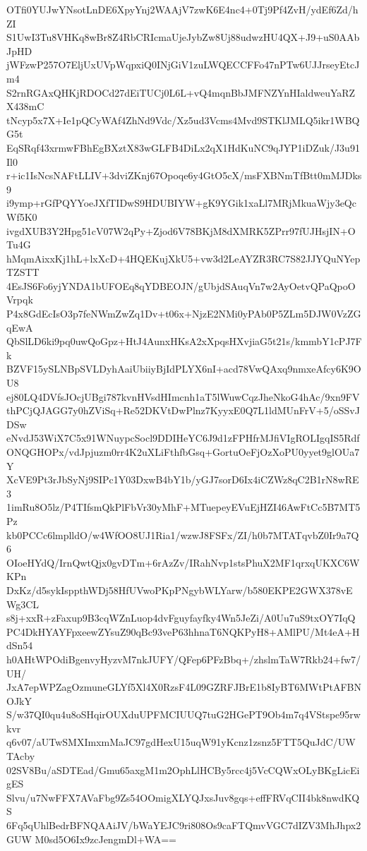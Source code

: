 OTfi0YUJwYNsotLnDE6XpyYnj2WAAjV7zwK6E4nc4+0Tj9Pf4ZvH/ydEf6Zd/hZI
S1UwI3Tu8VHKq8wBr8Z4RbCRIcmaUjeJybZw8Uj88udwzHU4QX+J9+uS0AAbJpHD
jWFzwP257O7EljUxUVpWqpxiQ0INjGiV1zuLWQECCFFo47nPTw6UJJrseyEtcJm4
S2rnRGAxQHKjRDOCd27dEiTUCj0L6L+vQ4mqnBbJMFNZYnHIaldweuYaRZX438mC
tNcyp5x7X+Ie1pQCyWAf4ZhNd9Vdc/Xz5ud3Vcms4Mvd9STKlJMLQ5ikr1WBQG5t
EqSRqf43xrmwFBhEgBXztX83wGLFB4DiLx2qX1HdKuNC9qJYP1iDZuk/J3u91Il0
r+ic1IsNcsNAFtLLIV+3dviZKnj67Opoqe6y4GtO5cX/msFXBNmTfBtt0mMJDks9
i9ymp+rGfPQYYoeJXfTIDwS9HDUBIYW+gK9YGik1xaLl7MRjMkuaWjy3eQcWf5K0
ivgdXUB3Y2Hpg51cV07W2qPy+Zjod6V78BKjM8dXMRK5ZPrr97fUJHsjIN+OTu4G
hMqmAixxKj1hL+lxXcD+4HQEKujXkU5+vw3d2LeAYZR3RC7S82JJYQuNYepTZSTT
4EsJS6Fo6yjYNDA1bUFOEq8qYDBEOJN/gUbjdSAuqVn7w2AyOetvQPaQpoOVrpqk
P4x8GdEcIsO3p7feNWmZwZq1Dv+t06x+NjzE2NMi0yPAb0P5ZLm5DJW0VzZGqEwA
QbSlLD6ki9pq0uwQoGpz+HtJ4AunxHKsA2xXpqsHXvjiaG5t21s/kmmbY1cPJ7Fk
BZVF15ySLNBpSVLDyhAaiUbiiyBjIdPLYX6nI+acd78VwQAxq9nmxeAfcy6K9OU8
ej80LQ4DVfsJOcjUBgi787kvnHVsdHImcnh1aT5lWuwCqzJheNkoG4hAc/9xn9FV
thPCjQJAGG7y0hZViSq+Re52DKVtDwPlnz7KyyxE0Q7L1ldMUnFrV+5/oSSvJDSw
eNvdJ53WiX7C5x91WNuypcSocl9DDIHeYC6J9d1zFPHfrMJfiVIgROLIgqIS5Rdf
ONQGHOPx/vdJpjuzm0rr4K2uXLiFthfbGsq+GortuOeFjOzXoPU0yyet9glOUa7Y
XcVE9Pt3rJbSyNj9SIPc1Y03DxwB4bY1b/yGJ7sorD6Ix4iCZWz8qC2B1rN8wRE3
1imRu8O5lz/P4TIfsmQkPlFbVr30yMhF+MTuepeyEVuEjHZI46AwFtCc5B7MT5Pz
kb0PCCc6lmplldO/w4WfOO8UJ1Ria1/wzwJ8FSFx/ZI/h0b7MTATqvbZ0Ir9a7Q6
OIoeHYdQ/IrnQwtQjx0gvDTm+6rAzZv/IRahNvp1stsPhuX2MF1qrxqUKXC6WKPn
DxKz/d5sykIsppthWDj58HfUVwoPKpPNgybWLYarw/b580EKPE2GWX378vEWg3CL
s8j+xxR+zFaxup9B3cqWZnLuop4dvFguyfayfky4Wn5JeZi/A0Uu7uS9txOY7IqQ
PC4DkHYAYFpxeewZYsuZ90qBc93veP63hhnaT6NQKPyH8+AMlPU/Mt4eA+HdSn54
h0AHtWPOdiBgenvyHyzvM7nkJUFY/QFep6PFzBbq+/zhslmTaW7Rkb24+fw7/UH/
JxA7epWPZagOzmuneGLYf5Xl4X0RzsF4L09GZRFJBrE1b8IyBT6MWtPtAFBNOJkY
S/w37QI0qu4u8oSHqirOUXduUPFMCIUUQ7tuG2HGePT9Ob4m7q4VStspe95rwkvr
q6v07/aUTwSMXImxmMaJC97gdHexU15uqW91yKcnz1zsnz5FTT5QuJdC/UWTAcby
02SV8Bu/aSDTEad/Gmu65axgM1m2OphLlHCBy5rcc4j5VcCQWxOLyBKgLicEigES
Slvu/u7NwFFX7AVaFbg9Zs54OOmigXLYQJxsJuv8gqs+effFRVqCII4bk8nwdKQS
6Fq5qUhlBedrBFNQAAiJV/bWaYEJC9ri808Os9caFTQmvVGC7dIZV3MhJhpx2GUW
M0sd5O6Ix9zcJengmDl+WA==
